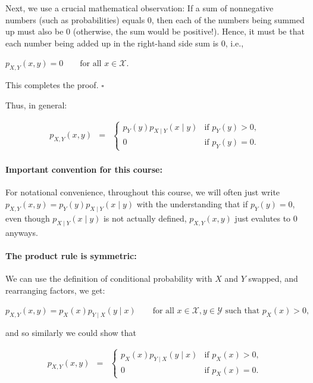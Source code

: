 \documentclass[6008notes.tex]{subfiles}
\begin{document}
Next, we use a crucial mathematical observation: If a sum of nonnegative numbers (such as probabilities) equals 0, then each of the numbers being summed up must also be 0 (otherwise, the sum would be positive!). Hence, it must be that each number being added up in the right-hand side sum is 0, i.e.,

{\centering$p_{X,Y}(x,y)=0\qquad \text {for all }x\in \mathcal{X}.$ \par}
 
This completes the proof. $\square$

Thus, in general:

\begin{eqnarray*}
p_{X,Y}(x,y)
&=&
\begin{cases}
p_{Y}(y)p_{X\mid Y}(x\mid y) & \text{if }p_{Y}(y)>0,\\
0 & \text{if }p_{Y}(y)=0.
\end{cases}
\end{eqnarray*}

\paragraph{Important convention for this course:} For notational convenience, throughout this course, we will often just write $p_{X,Y}(x,y)=p_{Y}(y)p_{X\mid Y}(x\mid y)$ with the understanding that if $p_{Y}(y)=0$, even though $p_{X\mid Y}(x\mid y)$ is not actually defined, $p_{X,Y}(x,y)$ just evalutes to 0 anyways.

\paragraph{The product rule is symmetric:} We can use the definition of conditional probability with $X$ and $Y$ swapped, and rearranging factors, we get:

{\centering$p_{X,Y}(x,y)=p_{X}(x)p_{Y\mid X}(y\mid x)\qquad \text {for all }x\in \mathcal{X},y\in \mathcal{Y}\text { such that }p_{X}(x)>0,$ \par}
 
and so similarly we could show that

\begin{eqnarray*}
p_{X,Y}(x,y)
&=&
\begin{cases}
p_{X}(x)p_{Y\mid X}(y\mid x) & \text{if }p_{X}(x)>0,\\
0 & \text{if }p_{X}(x)=0.
\end{cases}
\end{eqnarray*}
\end{document}
